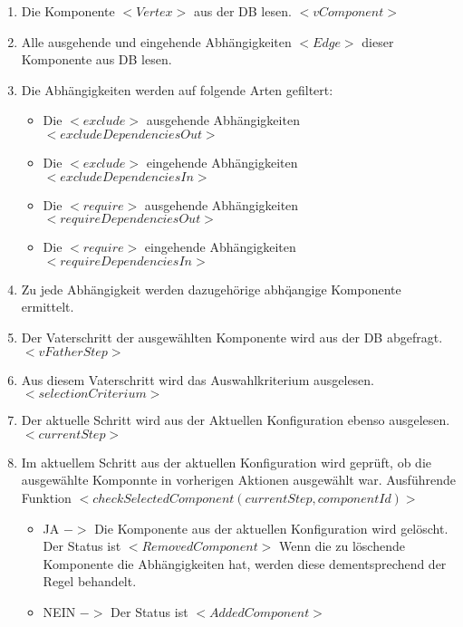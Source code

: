 \documentclass{article}
\begin{document}
\begin{enumerate}
    \item Die Komponente $<Vertex>$ aus der DB lesen. $<vComponent>$
    
    \item Alle ausgehende und eingehende Abh\"angigkeiten $<Edge>$ dieser
    Komponente aus DB lesen.
    
    \item Die Abh\"angigkeiten werden auf folgende Arten gefiltert:
    
    \begin{itemize}
        \item Die $<exclude>$ ausgehende Abh\"angigkeiten
        $<excludeDependenciesOut>$
        \item Die $<exclude>$ eingehende Abh\"angigkeiten
        $<excludeDependenciesIn>$
        \item Die $<require>$ ausgehende Abh\"angigkeiten
        $<requireDependenciesOut>$
        \item Die $<require>$ eingehende Abh\"angigkeiten
        $<requireDependenciesIn>$
    \end{itemize}
    
    \item Zu jede Abh\"angigkeit werden dazugeh\"orige abh\"qangige Komponente
    ermittelt.
    
    \item Der Vaterschritt der ausgew\"ahlten Komponente wird aus der DB
    abgefragt. $<vFatherStep>$
    
    \item Aus diesem Vaterschritt wird das Auswahlkriterium ausgelesen.
    $<selectionCriterium>$
    
    \item Der aktuelle Schritt wird aus der Aktuellen Konfiguration ebenso
    ausgelesen. $<currentStep>$
    
    \item Im aktuellem Schritt aus der aktuellen Konfiguration wird gepr\"uft,
    ob die ausgew\"ahlte Komponnte in vorherigen Aktionen ausgew\"ahlt war.
    Ausf\"uhrende Funktion $<checkSelectedComponent(currentStep,componentId)>$
    
    \begin{itemize}
        \item JA $->$ Die Komponente aus der aktuellen Konfiguration wird
        gel\"oscht. Der Status ist $<RemovedComponent>$
        Wenn die zu l\"oschende Komponente die Abh\"angigkeiten hat, werden
        diese dementsprechend der Regel behandelt.
        \item NEIN $->$ Der Status ist $<AddedComponent>$
    \end{itemize}
    

\end{enumerate}
\end{document}
